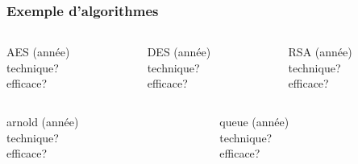         \begin{frame}
            \frametitle{Exemple d'algorithmes}
            \begin{columns}
                \begin{column}{.3\linewidth}
                    \begin{center}
                        AES (année)\\
                        technique?\\
                        efficace?
                    \end{center}
                \end{column}

                \begin{column}{.3\linewidth}
                    \begin{center}
                        DES (année)\\
                        technique?\\
                        efficace?
                    \end{center}
                \end{column}

                \begin{column}{.3\linewidth}
                    \begin{center}
                        RSA (année)\\
                        technique?\\
                        efficace?
                    \end{center}
                \end{column}
            \end{columns}

            \begin{columns}
                \begin{column}{.45\linewidth}
                    \begin{center}
                        arnold (année)\\
                        technique?\\
                        efficace?
                    \end{center}
                \end{column}

                \begin{column}{.45\linewidth}
                    \begin{center}
                        queue (année)\\
                        technique?\\
                        efficace?
                    \end{center}
                \end{column}
            \end{columns}
        \end{frame}
